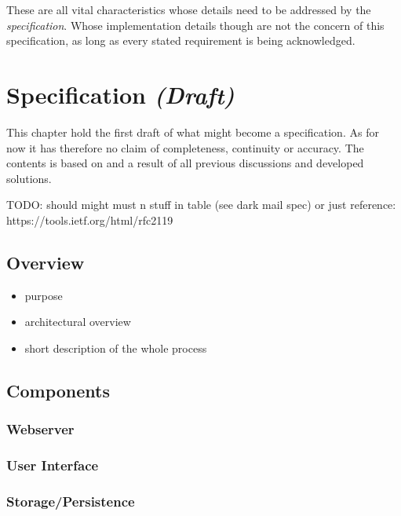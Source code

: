 \documentclass[12pt,english,a4paper,titlepage,cleardoublepage=empty,dottedtoc]{report}
\providecommand{\tightlist}{%
  \setlength{\itemsep}{0pt}\setlength{\parskip}{0pt}}
\begin{document}
These are all vital characteristics whose details need to be addressed
by the \emph{specification}. Whose implementation details though are not
the concern of this specification, as long as every stated requirement
is being acknowledged.

\chapter{\texorpdfstring{Specification
\emph{(Draft)}}{Specification (Draft)}}\label{specification-draft}

This chapter hold the first draft of what might become a specification.
As for now it has therefore no claim of completeness, continuity or
accuracy. The contents is based on and a result of all previous
discussions and developed solutions.

TODO: should might must n stuff in table (see dark mail spec) or just
reference: https://tools.ietf.org/html/rfc2119

\section{Overview}\label{overview}

\begin{itemize}
\tightlist
\item
  purpose
\item
  architectural overview
\item
  short description of the whole process
\end{itemize}

\section{Components}\label{components}

\subsection{Webserver}\label{webserver}

\subsection{User Interface}\label{user-interface}

\subsection{Storage/Persistence}\label{storagepersistence}
\end{document}
